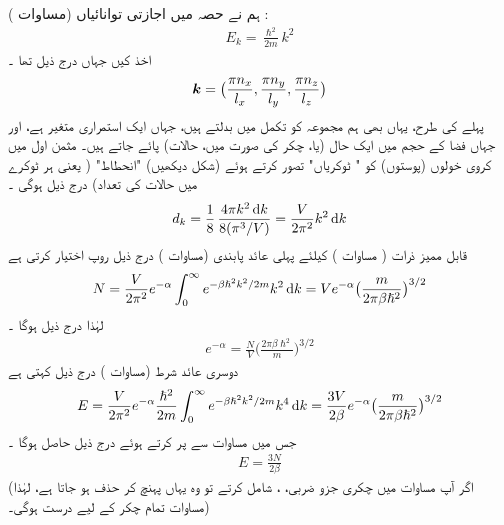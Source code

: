 ہم نے حصہ    میں  اجازتی توانائیاں  (مساوات ) :
\begin{align}
E_k = \frac{\hslash^2}{2 m} k^2
\end{align}
اخذ کیں  جہاں درج ذیل تھا ۔
\begin{align*}
{\ensuremath{{\boldsymbol{k}}}} = \big ( \frac{\pi n_x}{l_x} , \frac{\pi n_y}{l_y} , \frac{\pi n_z}{l_z} \big )
\end{align*}
پہلے کی  طرح،  یہاں بھی ہم مجموعہ کو تکمل میں بدلتے ہیں،  جہاں  ایک استمراری متغیر ہے،  اور جہاں  فضا کے  حجم میں ایک حال  (یا،  چکر  کی صورت میں،   حالات)  پائے جاتے ہیں۔ مثمن اول میں کروی  خولوں (پوستوں) کو   "  ٹوکریاں" تصور کرتے ہوئے  (شکل  دیکھیں) "انحطاط" ( یعنی ہر ٹوکرے  میں حالات کی تعداد)  درج ذیل ہوگی ۔
\begin{align}\label{مساوات_متماثل_انحطاط_پوست_کی}
d_k = \frac{1}{8}\, \frac{4 \pi k^2 \dif  k}{8 (\pi^3 /V)} = \frac{V}{2 \pi^2} k^2 \dif k
\end{align}
قابل ممیز ذرات ( مساوات  )   کیلئے پہلی  عائد  پابندی (مساوات )  درج ذیل روپ اختیار کرتی ہے 
\begin{align*}
N = \frac{V}{2 \pi^2} e^{- \alpha} \int_0^{\infty} e^{- \beta \hslash^2 k^2 / 2m} k^2 \dif  k = V e^{- \alpha} \big ( \frac{m}{2 \pi \beta \hslash^2} \big )^{3/2}
\end{align*}
لہٰذا درج ذیل ہوگا ۔
\begin{align}\label{مساوات_متماثل_درمیانہ_نتیجہ}
e^{- \alpha} = \frac{N}{V} \big ( \frac{2 \pi \beta \hslash^2}{m} \big )^{3/2}
\end{align}
دوسری  عائد  شرط (مساوات )   درج ذیل کہتی ہے 
\begin{align*}
E = \frac{V}{2 \pi^2} e^{- \alpha} \frac{\hslash^2}{2 m} \int_0^\infty e^{- \beta \hslash^2 k^2 /2m} k^4 \dif k = \frac{3 V}{2 \beta} e^{- \alpha} \big ( \frac{m}{2 \pi \beta \hslash^2} \big )^{3/2}
\end{align*}
جس میں مساوات  سے  پر کرتے ہوئے درج ذیل حاصل ہوگا ۔
\begin{align}\label{مساوات_متماثل_درست_ہر_صورت}
E = \frac{3 N}{2 \beta}
\end{align}
(اگر آپ مساوات  میں چکری جزو  ضربی، ،  شامل کرتے  تو وہ یہاں  پہنچ کر  حذف ہو جاتا ہے، لہٰذا مساوات  تمام چکر کے لیے درست ہوگی۔) 

